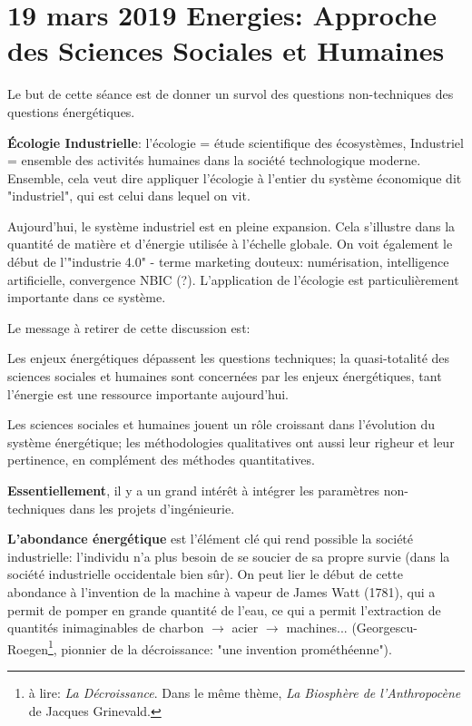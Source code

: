 \documentclass{article}
\begin{document}
\section{19 mars 2019 \quad Energies: Approche des Sciences Sociales et Humaines}
Le but de cette séance est de donner un survol des questions non-techniques des questions énergétiques. \par
\textbf{Écologie Industrielle}: l'écologie = étude scientifique des écosystèmes, Industriel = ensemble des activités humaines dans la société technologique moderne. Ensemble, cela veut dire appliquer l'écologie à l'entier du système économique dit "industriel", qui est celui dans lequel on vit. \par
 Aujourd'hui, le système industriel est en pleine expansion. Cela s'illustre dans la quantité de matière et d'énergie utilisée à l'échelle globale. On voit également le début de l'"industrie 4.0" - terme marketing douteux: numérisation, intelligence artificielle, convergence NBIC (?). L'application de l'écologie est particulièrement importante dans ce système. \par
 Le message à retirer de cette discussion est:
 \begin{center}
 	Les enjeux énergétiques dépassent les questions techniques; la quasi-totalité des sciences sociales et humaines sont concernées par les enjeux énergétiques, tant l'énergie est une ressource importante aujourd'hui. \par
 	Les sciences sociales et humaines jouent un rôle croissant dans l'évolution du système énergétique; les méthodologies qualitatives ont aussi leur righeur et leur pertinence, en complément des méthodes quantitatives. \par
 	\textbf{Essentiellement}, il y a un grand intérêt à intégrer les paramètres non-techniques dans les projets d'ingénieurie.
 \end{center}
 \textbf{L'abondance énergétique} est l'élément clé qui rend possible la société industrielle: l'individu n'a plus besoin de se soucier de sa propre survie (dans la société industrielle occidentale bien sûr). On peut lier le début de cette abondance à l'invention de la machine à vapeur de James Watt (1781), qui a permit de pomper en grande quantité de l'eau, ce qui a permit l'extraction de quantités inimaginables de charbon $\rightarrow$ acier $\rightarrow$ machines... (Georgescu-Roegen\footnote{à lire: \emph{La Décroissance}. Dans le même thème, \emph{La Biosphère de l'Anthropocène} de Jacques Grinevald.}, pionnier de la décroissance: "une invention prométhéenne"). \par
\end{document}
